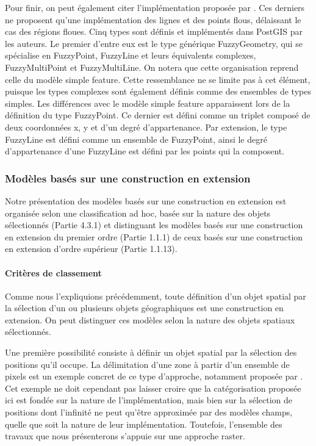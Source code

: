 Pour finir, on peut également citer l’implémentation proposée par
\textcite{Carniel2016}. Ces derniers ne proposent qu’une
implémentation des lignes et des points flous, délaissant le cas des
régions floues. Cinq types sont définis et implémentés dans PostGIS
par les auteurs. Le premier d’entre eux est le type générique
FuzzyGeometry, qui se spécialise en FuzzyPoint, FuzzyLine et leurs
équivalents complexes, FuzzyMultiPoint et FuzzyMultiLine. On notera
que cette organisation reprend celle du modèle simple feature. Cette
ressemblance ne se limite pas à cet élément, puisque les types
complexes sont également définis comme des ensembles de types
simples. Les différences avec le modèle simple feature apparaissent
lors de la définition du type FuzzyPoint. Ce dernier est défini comme
un triplet composé de deux coordonnées x, y et d’un degré
d’appartenance. Par extension, le type FuzzyLine est défini comme un
ensemble de FuzzyPoint, ainsi le degré d’appartenance d’une FuzzyLine
est défini par les points qui la composent.

\subsubsection{Modèles basés sur une construction en extension}

Notre présentation des modèles basés sur une construction en extension
est organisée selon une classification ad hoc, basée sur la nature des
objets sélectionnés (Partie 4.3.1) et distinguant les modèles basés
sur une construction en extension du premier ordre (Partie 1.1.1) de
ceux basés sur une construction en extension d’ordre supérieur (Partie
1.1.13).

\paragraph{Critères de classement}

Comme nous l’expliquions précédemment, toute définition d’un objet
spatial par la sélection d’un ou plusieurs objets géographiques est
une construction en extension. On peut distinguer ces modèles selon la
nature des objets spatiaux sélectionnés.

Une première possibilité consiste à définir un objet spatial par la
sélection des positions qu’il occupe. La délimitation d’une zone à
partir d’un ensemble de pixels est un exemple concret de ce type
d’approche, notamment proposée par \textcite{Zhan1997}. Cet exemple ne
doit cependant pas laisser croire que la catégorisation proposée ici
est fondée sur la nature de l’implémentation, mais bien sur la
sélection de positions dont l’infinité ne peut qu’être approximée par
des modèles champs, quelle que soit la nature de leur
implémentation. Toutefois, l’ensemble des travaux que nous
présenterons s’appuie sur une approche raster.

